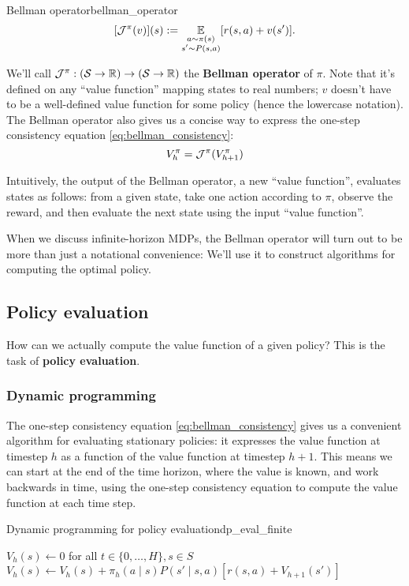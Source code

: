 \documentclass[\main/main]{subfiles}
\begin{document}
\begin{definition}{Bellman operator}{bellman_operator}
\[
    [\mathcal{J}^{\pi}(v)](s) := \operatorname*{\mathbb{E}}_{\substack{a \sim \pi(s) \\ s' \sim P(s, a)}} [r(s, a) + v(s')].
\]
\end{definition}

We'll call $\mathcal{J}^\pi : (\mathcal{S} \to \mathbb{R}) \to (\mathcal{S} \to \mathbb{R})$ the \textbf{Bellman operator} of $\pi$. Note that it's defined on any ``value function'' mapping states to real numbers; $v$ doesn't have to be a well-defined value function for some policy (hence the lowercase notation). The Bellman operator also gives us a concise way to express the one-step consistency equation \eqref{eq:bellman_consistency}:
\[
    V_h^\pi = \mathcal{J}^{\pi}(V_{h+1}^\pi)
\]

Intuitively, the output of the Bellman operator, a new ``value function'', evaluates states as follows: from a given state, take one action according to $\pi$, observe the reward, and then evaluate the next state using the input ``value function''.

When we discuss infinite-horizon MDPs, the Bellman operator will turn out to be more than just a notational convenience: We'll use it to construct algorithms for computing the optimal policy.

\subsection{Policy evaluation}

How can we actually compute the value function of a given policy? This is the task of \textbf{policy evaluation}.

\subsubsection{Dynamic programming}
\label{sec:dp}

The one-step consistency equation \eqref{eq:bellman_consistency} gives us a convenient algorithm for evaluating stationary policies: it expresses the value function at timestep $h$ as a function of the value function at timestep $h+1$. This means we can start at the end of the time horizon, where the value is known, and work backwards in time, using the one-step consistency equation to compute the value function at each time step.

\begin{definition}{Dynamic programming for policy evaluation}{dp_eval_finite}
    \begin{algorithmic}
\State $V_h(s) \gets 0$ for all $t \in \{ 0, \dots, H \}, s \in S$
        \State $V_h(s) \gets V_h(s) + \pi_h(a \mid s) P(s' \mid s, a) [r(s, a) + V_{h+1}(s')]$
    \EndFor
\EndFor
    \end{algorithmic}
\end{definition}
\end{document}

